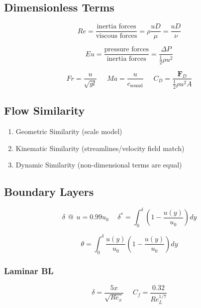 \documentclass[twocolumn, 12pt]{article}
\begin{document}
{%
\subsection*{Dimensionless Terms}
\begin{equation*}
    Re = \frac{\text{inertia forces}}{\text{viscous forces}} = \rho \frac{uD}{\mu} = \frac{uD}{\nu}
\end{equation*}

\begin{equation*}
    Eu = \frac{\text{pressure forces}}{\text{inertia forces}}= \frac{\Delta P}{\frac{1}{2}\rho u^2}
\end{equation*}

\begin{equation*}
    Fr = \frac{u}{\sqrt{gl}}  \hspace{17pt} Ma = \frac{u}{c_{\text{sound}}} \hspace{17pt}  C_D=\frac{\textbf{F}_D}{\frac{1}{2}\rho u^2A}
\end{equation*}



%
\subsection*{Flow Similarity}
\begin{enumerate}
    \item Geometric Similarity (scale model)
    \item Kinematic Similarity (streamlines/velocity field match)
    \item Dynamic Similarity (non-dimensional terms are equal)
\end{enumerate}

\subsection*{Boundary Layers}
\begin{equation*}
    \delta \hspace{5pt} @ \hspace{5pt} u=0.99u_0   \hspace{15pt} \delta^* = \int_0^\delta \left( 1-\frac{u(y)}{u_0} \right)dy
\end{equation*}

\begin{equation*}
    \theta = \int_0^\delta \frac{u(y)}{u_0}\left( 1 - \frac{u(y)}{u_0} \right)dy
\end{equation*}


\subsubsection*{Laminar BL}
\begin{equation*}
    \delta =\frac{5x}{\sqrt{Re_x}} \hspace{15pt} C_f = \frac{0.32}{Re_L^{1/7}}
\end{equation*}

}
\end{document}
